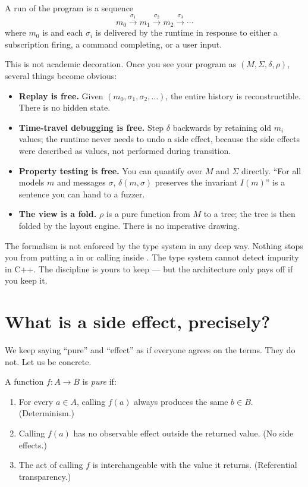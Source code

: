A run of the program is a sequence
\[
  m_0 \xrightarrow{\sigma_1} m_1 \xrightarrow{\sigma_2} m_2
  \xrightarrow{\sigma_3} \cdots
\]
where $m_0$ is  and each $\sigma_i$ is delivered by
the runtime in response to either a subscription firing, a command
completing, or a user input.

This is not academic decoration. Once you see your program as
$(M, \Sigma, \delta, \rho)$, several things become obvious:

\begin{itemize}[leftmargin=*]
  \item \textbf{Replay is free.} Given $(m_0, \sigma_1, \sigma_2,
    \ldots)$, the entire history is reconstructible. There is no
    hidden state.
  \item \textbf{Time-travel debugging is free.} Step $\delta$
    backwards by retaining old $m_i$ values; the runtime never
    needs to undo a side effect, because the side effects were
    described as values, not performed during transition.
  \item \textbf{Property testing is free.} You can quantify over
    $M$ and $\Sigma$ directly. ``For all models $m$ and messages
    $\sigma$, $\delta(m, \sigma)$ preserves the invariant
    $I(m)$'' is a sentence you can hand to a fuzzer.
  \item \textbf{The view is a fold.} $\rho$ is a pure function
    from $M$ to a tree; the tree is then folded by the layout
    engine. There is no imperative drawing.
\end{itemize}

\begin{aside}
The formalism is not enforced by the type system in any deep way.
Nothing stops you from putting a  in 
or calling  inside . The type
system cannot detect impurity in C++. The discipline is yours to
keep --- but the architecture only pays off if you keep it.
\end{aside}

\section{What is a side effect, precisely?}

We keep saying ``pure'' and ``effect'' as if everyone agrees on
the terms. They do not. Let us be concrete.

A function $f : A \to B$ is \emph{pure} if:

\begin{enumerate}[leftmargin=*]
  \item For every $a \in A$, calling $f(a)$ always produces the
    same $b \in B$. (Determinism.)
  \item Calling $f(a)$ has no observable effect outside the
    returned value. (No side effects.)
  \item The act of calling $f$ is interchangeable with the value
    it returns. (Referential transparency.)
\end{enumerate}

